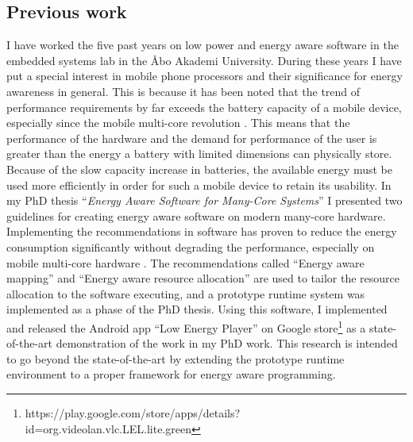 \documentclass{article}
\begin{document}
\subsection{Previous work}
I have worked the five past years on low power and energy aware software in the embedded systems lab in the \AA{}bo Akademi University. 
During these years I have put a special interest in mobile phone processors and their significance for energy awareness in general. 
This is because it has been noted that the trend of performance requirements by far exceeds the battery capacity of a mobile device, especially since the mobile multi-core revolution \cite{BatteryCapacity,CPUCapacity}. 
This means that the performance of the hardware and the demand for performance of the user is greater than the energy a battery with limited dimensions can physically store. 
Because of the slow capacity increase in batteries, the available energy must be used more efficiently in order for such a mobile device to retain its usability.
In my PhD thesis ``\textit{Energy Aware Software for Many-Core Systems}'' I presented two guidelines for creating energy aware software on modern many-core hardware. 
Implementing the recommendations in software has proven to reduce the energy consumption significantly without degrading the performance, especially on mobile multi-core hardware \cite{HolmbackaHipeac}. 
The recommendations called ``Energy aware mapping'' and ``Energy aware resource allocation'' are used to tailor the resource allocation to the software executing, 
and a prototype runtime system was implemented as a phase of the PhD thesis. 
Using this software, I implemented and released the Android app “Low Energy Player” on Google store\footnote{https://play.google.com/store/apps/details?id=org.videolan.vlc.LEL.lite.green} as a state-of-the-art demonstration of the work in my PhD work. 
This research is intended to go beyond the state-of-the-art by extending the prototype runtime environment to a proper framework for energy aware programming.
\end{document}
